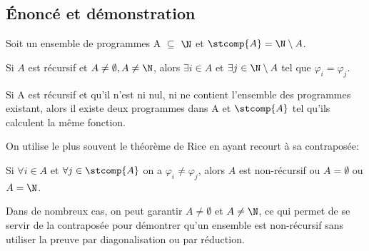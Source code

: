 \subsection{Énoncé et démonstration}

Soit un ensemble de programmes A $\subseteq$ $\N$ et $\stcomp{A} = \N \setminus A$.

\begin{mytheo}[Rice]
	Si $A$ est récursif et $A\neq \emptyset, A \neq \N$, alors $\exists i \in A$ et $\exists j \in \N \setminus A$ tel que $\varphi _i = \varphi _j$.
	
	Si A est récursif et qu'il n'est ni nul, ni ne contient l'ensemble des programmes existant, alors il existe deux programmes dans A et $\stcomp{A}$ tel qu'ils calculent la même fonction. 
\end{mytheo}

On utilise le plus souvent le théorème de Rice en ayant recourt à sa contraposée:

\begin{mytheo}
	Si $\forall  i \in A$ et $\forall j \in \stcomp{A}$ on a $\varphi_i \neq \varphi_j$, alors $A$ est non-récursif ou $A = \emptyset$ ou $A = \N$.
\end{mytheo}

Dans de nombreux cas, on peut garantir $A \neq \emptyset$ et $A \neq \N$, ce qui permet de se servir de la contraposée pour démontrer qu'un ensemble est non-récursif sans utiliser la preuve par diagonalisation ou par réduction.


